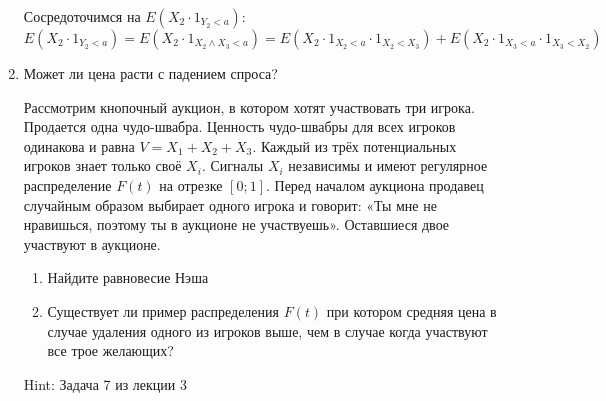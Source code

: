 \begin{enumerate}
Сосредоточимся на $ E(X_{2}\cdot 1_{Y_{2}<a}) $:
\begin{equation}
E(X_{2}\cdot 1_{Y_{2}<a})=E(X_{2}\cdot 1_{X_{2}\wedge X_{3}<a})=E(X_{2}\cdot 1_{X_{2}<a}\cdot 1_{X_{2}<X_{3}})+E(X_{2}\cdot 1_{X_{3}<a}\cdot 1_{X_{3}<X_{2}})
\end{equation}





\item Может ли цена расти с падением спроса?

Рассмотрим кнопочный аукцион, в котором хотят участвовать три игрока. Продается одна чудо-швабра. Ценность чудо-швабры для всех игроков одинакова и равна $ V=X_{1}+X_{2}+X_{3} $. Каждый из трёх потенциальных игроков знает только своё $ X_{i} $. Сигналы $ X_{i} $ независимы и имеют регулярное распределение $ F(t) $ на отрезке $ [0;1] $. Перед началом аукциона продавец случайным образом выбирает одного игрока и говорит: «Ты мне не нравишься, поэтому ты в аукционе не участвуешь». Оставшиеся двое участвуют в аукционе.

\begin{enumerate}
\item Найдите равновесие Нэша
\item Существует ли пример распределения $ F(t) $ при котором средняя цена в случае удаления одного из игроков выше, чем в случае когда участвуют все трое желающих?
\end{enumerate}

Hint: Задача 7 из лекции 3




\end{enumerate}
